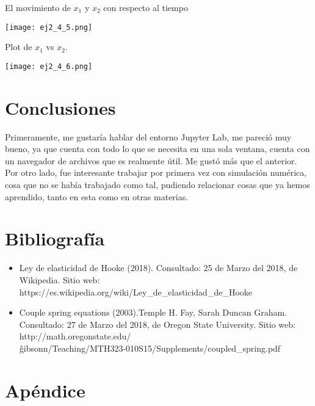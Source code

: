 \documentclass[12pt]{article}
\begin{document}
\begin{itemize}
\begin{itemize}
El movimiento de $x_1$ y $x_2$ con respecto al tiempo

\begin{center}
        \texttt{[image: ej2\_4\_5.png]}
\end{center}

Plot de $x_1$ vs $x_2$.

\begin{center}
        \texttt{[image: ej2\_4\_6.png]}
\end{center}

\end{itemize}

\end{itemize}

\section{Conclusiones}

Primeramente, me gustaría hablar del entorno Jupyter Lab, me pareció muy bueno, ya que cuenta con todo lo que se necesita en una sola ventana, cuenta con un navegador de archivos que es realmente útil. Me gustó más que el anterior. \\

Por otro lado, fue interesante trabajar por primera vez con simulación numérica, cosa que no se había trabajado como tal, pudiendo relacionar cosas que ya hemos aprendido, tanto en esta como en otras materias. 

\section{Bibliografía}

\begin{itemize}
\item Ley de elasticidad de Hooke (2018). Consultado: 25 de Marzo del 2018, de Wikipedia. Sitio web: https://es.wikipedia.org/wiki/Ley\_de\_elasticidad\_de\_Hooke
\item Couple spring equations (2003).Temple H. Fay, Sarah Duncan Graham. Consultado: 27 de Marzo del 2018, de Oregon State University. Sitio web:  http://math.oregonstate.edu/\\
\~gibsonn/Teaching/MTH323-010S15/Supplements/coupled\_spring.pdf
\end{itemize}

\section{Apéndice}
\end{document}
